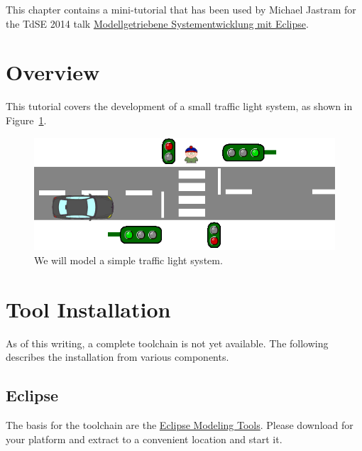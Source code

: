 This chapter contains a mini-tutorial that has been used by Michael Jastram for the TdSE 2014 talk \href{http://www.tdse.org/programm2013/termine/icalrepeat.detail/2014/11/12/83/-/t2-modellgetriebene-systementwicklung-mit-eclipse.html}{Modellgetriebene Systementwicklung mit Eclipse}.

\section{Overview}

This tutorial covers the development of a small traffic light system, as shown in Figure~\ref{fig:trafficlight}.

\begin{figure}[h!]
  \centering
  \includegraphics[width=\linewidth]{../se-images/trafficlight.png}
  \caption{We will model a simple traffic light system.}
  \label{fig:trafficlight}
\end{figure}

\section{Tool Installation}

As of this writing, a complete toolchain is not yet available.  The following describes the installation from various components.

\subsection{Eclipse}

The basis for the toolchain are the \href{https://www.eclipse.org/downloads/packages/eclipse-modeling-tools/lunasr1}{Eclipse Modeling Tools}.  Please download for your platform and extract to a convenient location and start it.

